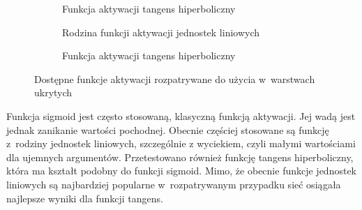 \begin{figure}[htbp]
\centering
\begin{subfigure}[t]{0.3\textwidth}
\centering
{}
\caption{Funkcja aktywacji tangens hiperboliczny}
\end{subfigure}
\hspace{0.25cm}
\begin{subfigure}[t]{0.3\textwidth}
\centering
{}
\caption{Rodzina funkcji aktywacji jednostek liniowych}
\end{subfigure}
\hspace{0.25cm}
\begin{subfigure}[t]{0.3\textwidth}
\centering
{}
\caption{Funkcja aktywacji tangens hiperboliczny}
\end{subfigure}
\caption{Dostępne funkcje aktywacji rozpatrywane do użycia w~warstwach
         ukrytych}
\label{fig:activation}
\end{figure}
Funkcja sigmoid jest często stosowaną, klasyczną funkcją aktywacji.
Jej wadą jest jednak zanikanie wartości pochodnej.
Obecnie częściej stosowane są funkcję z~rodziny jednostek liniowych,
szczególnie z wyciekiem, czyli małymi wartościami dla ujemnych argumentów.
Przetestowano również funkcję tangens hiperboliczny, która ma kształt
podobny do funkcji sigmoid.
Mimo, że obecnie funkcje jednostek liniowych są najbardziej popularne
w~rozpatrywanym przypadku sieć osiągała najlepsze wyniki dla funkcji tangens.

